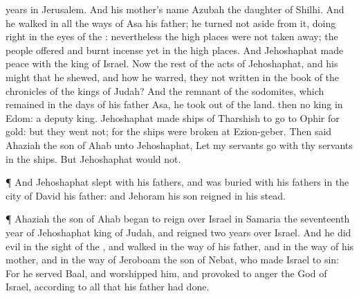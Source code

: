 {years in
Jerusalem. And his
mother’s
name
{}
Azubah the
daughter of
Shilhi.
And he
walked in all the
ways of
Asa his
father; he turned not
aside from it,
doing
{}
right in the
eyes of the
{}: nevertheless the high
places were not taken
away;
{} the
people
offered and burnt
incense yet in the high
places.
And
Jehoshaphat made
peace with the
king of
Israel.
Now the
rest of the
acts of
Jehoshaphat, and his
might that he
shewed, and how he
warred,
{} they not
written in the
book of the
chronicles of the
kings of
Judah?
And the
remnant of the
sodomites, which
remained in the
days of his
father
Asa, he
took out of the
land.
 then no
king in
Edom: a
deputy
{}
king.
Jehoshaphat
made
ships of
Tharshish to
go to
Ophir for
gold: but they
went not; for the
ships were
broken at
Ezion-geber.
Then
said
Ahaziah the
son of
Ahab unto
Jehoshaphat, Let my
servants
go with thy
servants in the
ships. But
Jehoshaphat
would not.
\par }{\PP {}¶ And
Jehoshaphat
slept with his
fathers, and was
buried with his
fathers in the
city of
David his
father: and
Jehoram his
son
reigned in his stead.
\par }{\PP {}¶
Ahaziah the
son of
Ahab began to
reign over
Israel in
Samaria the
seventeenth
year of
Jehoshaphat
king of
Judah, and
reigned two
years over
Israel.
And he
did
evil in the
sight of the
{}, and
walked in the
way of his
father, and in the
way of his
mother, and in the
way of
Jeroboam the
son of
Nebat, who made
Israel to
sin:
For he
served
Baal, and
worshipped him, and provoked to
anger the
{}
God of
Israel, according to all that his
father had
done.
\par }